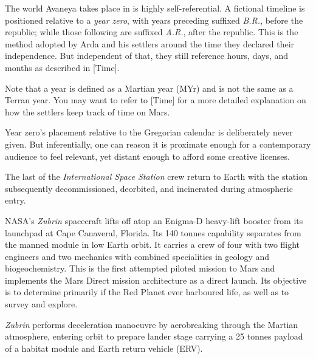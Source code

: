 
\startlines

The world Avaneya takes place in is highly self-referential. A fictional timeline is positioned relative to a {\it year zero}, with years preceding suffixed {\it B.R.}, before the republic; while those following are suffixed {\it A.R.}, after the republic. This is the method adopted by Arda and his settlers around the time they declared their independence. But independent of that, they still reference hours, days, and months as described in [Time].

Note that a year is defined as a Martian year (MYr) and is not the same as a Terran year. You may want to refer to [Time] for a more detailed explanation on how the settlers keep track of time on Mars.

Year zero's placement relative to the Gregorian calendar is deliberately never given. But inferentially, one can reason it is proximate enough for a contemporary audience to feel relevant, yet distant enough to afford some creative licenses.
\crlf

The last of the {\it International Space Station} crew return to Earth with the station subsequently decommissioned, deorbited, and incinerated during atmospheric entry.
\StopTimelineDate

NASA's {\it Zubrin} spacecraft lifts off atop an Enigma-D heavy-lift booster from its launchpad at Cape Canaveral, Florida. Its 140 tonnes capability separates from the manned module in low Earth orbit. It carries a crew of four with two flight engineers and two mechanics with combined specialities in geology and biogeochemistry. This is the first attempted piloted mission to Mars and implements the Mars Direct mission architecture as a direct launch. Its objective is to determine primarily if the Red Planet ever harboured life, as well as to survey and explore.
\StopTimelineDate

{\it Zubrin} performs deceleration manoeuvre by aerobreaking through the Martian atmosphere, entering orbit to prepare lander stage carrying a 25 tonnes payload of a habitat module and Earth return vehicle (ERV).
\StopTimelineDate


